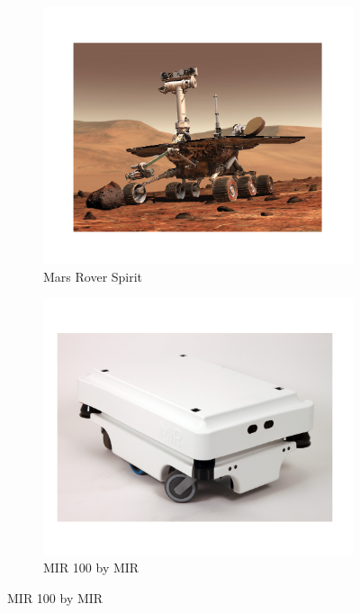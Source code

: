 \begin{figure}[h]
\label{fig:mobile_robots}
	\centering
    \begin{subfigure}[b]{0.32\textwidth}
        \includegraphics[width=\textwidth]{figures/mobile_rover.pdf}
        \caption{Mars Rover Spirit}
        \label{fig:mobile_rover}
    \end{subfigure}
    \centering
    \begin{subfigure}[b]{0.32\textwidth}
        \includegraphics[width=\textwidth]{figures/mobile_mir.pdf}
        \caption{MIR 100 by MIR}

\end{subfigure}
\end{figure}
